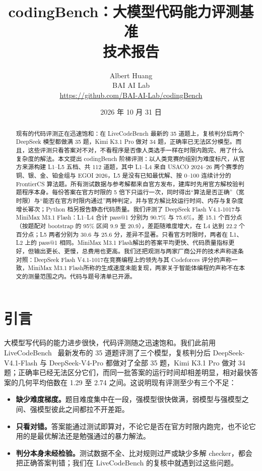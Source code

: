 \documentclass[11pt,a4paper,fontset=none]{ctexart}
\title{\textbf{codingBench：大模型代码能力评测基准}\\[0.3em]\large 技术报告}
\author{Albert Huang\\BAI AI Lab\\\small\url{https://github.com/BAI-AI-Lab/codingBench}}
\date{2026 年 10 月 31 日}
\newcommand{\ds}{DeepSeek Flash V4.1-1017}
\newcommand{\mini}{MiniMax M3.1 Flash}
\newcommand{\lead}[1]{\textbf{#1}\quad}
\begin{document}
\maketitle

\begin{abstract}
现有的代码评测正在迅速饱和：在 LiveCodeBench 最新的 35 道题上，复核判分后两个 DeepSeek 模型都做满 35 题，Kimi K3.1 Pro 做对 34 题，正确率已无法区分模型。而且，这些评测只看答案对不对，不看程序是否像人类选手一样在时限内跑完、用了什么复杂度的解法。本文提出 codingBench 阶梯评测：以人类竞赛的组别为难度标尺，从官方来源构建 L1--L5 五档、共 112 道题，其中 L1--L4 来自 USACO 2024--26 两个赛季的铜、银、金、铂金组与 EGOI 2026，L5 是没有已知最优解、按 0--100 连续计分的 FrontierCS 算法题。所有测试数据与参考解都来自官方发布，建库时先用官方解校验判题程序本身。每份答案在官方时限的 5 倍下只运行一次，同时得出“算法是否正确”（宽时限）与“能否在官方时限内通过”两种判定，并与官方解比较运行时间、内存与复杂度增长幂次；Python 档另报告静态代码质量。我们评测了 \ds 与 \mini：L1--L4 合计 pass@1 分别为 90.7\% 与 75.6\%，差 15.1 个百分点（按题配对 bootstrap 的 95\% 区间 9.9 至 20.9），差距随难度增大，在 L4 达到 22.2 个百分点；L5 两者分别为 30.6 与 25.6 分，差异不显著。只看官方时限时，两者在 L1、L2 上的 pass@1 相同。\mini 解出的答案平均更快、代码质量指标更好，但输出更长、更慢，总费用也更高。我们还把观测与两家厂商公开的技术声称逐条对照：\ds 在竞赛编程上的领先与其 Codeforces 评分的声称一致，\mini 所称的生成速度未能复现，两家关于智能体编程的声称不在本文的测量范围之内。代码与题号清单已开源。
\end{abstract}

\section{引言}

大模型写代码的能力进步很快，代码评测随之迅速饱和。我们此前用 LiveCodeBench~\cite{lcb} 最新发布的 35 道题评测了三个模型，复核判分后 DeepSeek-V4.1-Flash 与 DeepSeek-V4-Pro 都做对了全部 35 题，Kimi K3.1 Pro 做对 34 题；正确率已经无法区分它们，而同一批答案的运行时间却相差明显，相对最快答案的几何平均倍数在 1.29 至 2.74 之间。这说明现有评测至少有三个不足：

\begin{itemize}[leftmargin=1.6em]
  \item \lead{缺少难度梯度。}题目难度集中在一段，强模型很快做满，弱模型与强模型之间、强模型彼此之间都拉不开差距。
  \item \lead{只看对错。}答案能通过测试即算对，不论它是否在官方时限内跑完，也不论它用的是最优解法还是勉强通过的暴力解法。
  \item \lead{判分本身未经检验。}测试数据不全、比对规则过严或缺少多解 checker，都会把正确答案判错；我们在 LiveCodeBench 的复核中就遇到过这些问题。
\end{itemize}
\end{document}
